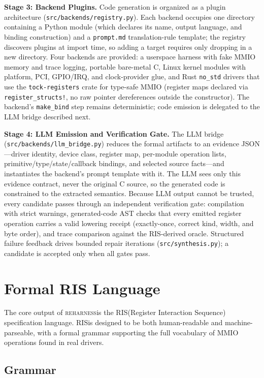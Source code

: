 \documentclass[sigplan, screen, review, anonymous]{acmart}
\newcommand{\reharness}{\textsc{reharness}}
\newcommand{\rislang}{RIS}
\begin{document}
\textbf{Stage 3: Backend Plugins.} Code generation is organized as a plugin architecture (\texttt{src/backends/registry.py}). Each backend occupies one directory containing a Python module (which declares its name, output language, and binding construction) and a \texttt{prompt.md} translation-rule template; the registry discovers plugins at import time, so adding a target requires only dropping in a new directory. Four backends are provided: a userspace harness with fake MMIO memory and trace logging, portable bare-metal C, Linux kernel modules with platform, PCI, GPIO/IRQ, and clock-provider glue, and Rust \texttt{no\_std} drivers that use the \texttt{tock-registers} crate for type-safe MMIO (register maps declared via \texttt{register\_structs!}, no raw pointer dereferences outside the constructor). The backend's \texttt{make\_bind} step remains deterministic; code emission is delegated to the LLM bridge described next.

\textbf{Stage 4: LLM Emission and Verification Gate.} The LLM bridge (\texttt{src/backends/llm\_bridge.py}) reduces the formal artifacts to an evidence JSON---driver identity, device class, register map, per-module operation lists, primitive/type/state/callback bindings, and selected source facts---and instantiates the backend's prompt template with it. The LLM sees only this evidence contract, never the original C source, so the generated code is constrained to the extracted semantics. Because LLM output cannot be trusted, every candidate passes through an independent verification gate: compilation with strict warnings, generated-code AST checks that every emitted register operation carries a valid lowering receipt (exactly-once, correct kind, width, and byte order), and trace comparison against the RIS-derived oracle. Structured failure feedback drives bounded repair iterations (\texttt{src/synthesis.py}); a candidate is accepted only when all gates pass.

\section{Formal RIS Language}

The core output of \reharness is the \rislang (Register Interaction Sequence) specification language. \rislang is designed to be both human-readable and machine-parseable, with a formal grammar supporting the full vocabulary of MMIO operations found in real drivers.

\subsection{Grammar}
\end{document}
